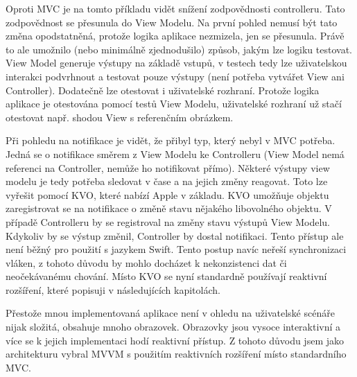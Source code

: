 Oproti MVC je na tomto příkladu vidět snížení zodpovědnosti controlleru. Tato zodpovědnost se přesunula do View Modelu.
Na první pohled nemusí být tato změna opodstatněná, protože logika aplikace nezmizela, jen se přesunula.
Právě to ale umožnilo (nebo minimálně zjednodušilo) způsob, jakým lze logiku testovat.
View Model generuje výstupy na základě vstupů, v testech tedy lze uživatelskou interakci podvrhnout a testovat pouze výstupy (není potřeba vytvářet View ani Controller).
Dodatečně lze otestovat i uživatelské rozhraní.
Protože logika aplikace je otestována pomocí testů View Modelu, uživatelské rozhraní už stačí otestovat např. shodou View s referenčním obrázkem.

Při pohledu na notifikace je vidět, že přibyl typ, který nebyl v MVC potřeba.
Jedná se o notifikace směrem z View Modelu ke Controlleru (View Model nemá referenci na Controller, nemůže ho notifikovat přímo).
Některé výstupy view modelu je tedy potřeba sledovat v čase a na jejich změny reagovat.
Toto lze vyřešit pomocí KVO, které nabízí Apple v základu.
KVO umožňuje objektu zaregistrovat se na notifikace o změně stavu nějakého libovolného objektu.
V případě Controlleru by se registroval na změny stavu výstupů View Modelu.
Kdykoliv by se výstup změnil, Controller by dostal notifikaci.
Tento přístup ale není běžný pro použití s jazykem Swift.
Tento postup navíc neřeší synchronizaci vláken, z tohoto důvodu by mohlo docházet k nekonzistenci dat či neočekávanému chování.
Místo KVO se nyní standardně používají reaktivní rozšíření, které popisuji v následujících kapitolách.

Přestože mnou implementovaná aplikace není v ohledu na uživatelské scénáře nijak složitá, obsahuje mnoho obrazovek.
Obrazovky jsou vysoce interaktivní a více se k jejich implementaci hodí reaktivní přístup.
Z tohoto důvodu jsem jako architekturu vybral MVVM s použitím reaktivních rozšíření místo standardního MVC.
